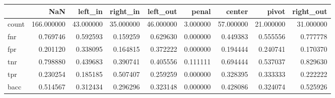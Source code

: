 \begin{tabular}{lrrrrrrrr}
\toprule
{} &         NaN &    left\_in &   right\_in &   left\_out &     penal &     center &      pivot &  right\_out \\
\midrule
count &  166.000000 &  43.000000 &  35.000000 &  46.000000 &  3.000000 &  57.000000 &  21.000000 &  31.000000 \\
fnr   &    0.769746 &   0.592593 &   0.159259 &   0.629630 &  0.000000 &   0.449383 &   0.555556 &   0.777778 \\
fpr   &    0.201120 &   0.338095 &   0.164815 &   0.372222 &  0.000000 &   0.194444 &   0.240741 &   0.170370 \\
tnr   &    0.798880 &   0.439683 &   0.390741 &   0.405556 &  0.111111 &   0.694444 &   0.537037 &   0.829630 \\
tpr   &    0.230254 &   0.185185 &   0.507407 &   0.259259 &  0.000000 &   0.328395 &   0.333333 &   0.222222 \\
bacc  &    0.514567 &   0.312434 &   0.296296 &   0.323148 &  0.000000 &   0.428086 &   0.324074 &   0.525926 \\
\bottomrule
\end{tabular}
